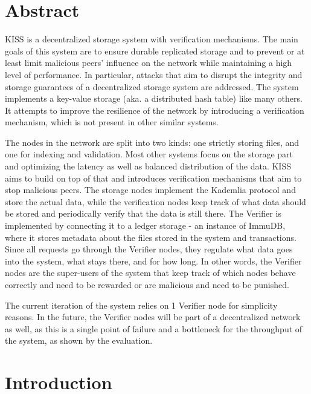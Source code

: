 \documentclass[ twoside,openright,titlepage,numbers=noenddot,headinclude,%
                footinclude=true,cleardoublepage=empty,abstractoff, %
                BCOR=5mm,paper=a4,fontsize=11pt,%
                ngerman,american,%
                ]{scrreprt}
\begin{document}
\raggedbottom
{} %
\pagestyle{plain}

\begingroup

\chapter*{Abstract}
KISS is a decentralized storage system with verification mechanisms.
The main goals of this system are to ensure durable replicated storage and to prevent
or at least limit malicious peers' influence on the network while maintaining a high level of performance.
In particular, attacks that aim to disrupt the integrity and
storage guarantees of a decentralized storage system are addressed.
The system implements a key-value storage (aka. a distributed hash table) like many others.
It attempts to improve the resilience of the network by introducing a verification mechanism,
which is not present in other similar systems.

The nodes in the network are split into two kinds: one strictly storing files,
and one for indexing and validation.
Most other systems focus on the storage part and optimizing the latency as well as balanced distribution
of the data.
KISS aims to build on top of that and introduces verification mechanisms that aim to stop malicious peers.
The storage nodes implement the Kademlia protocol and store the actual data,
while the verification nodes keep track of what data should be stored and periodically
verify that the data is still there.
The Verifier is implemented by connecting it to a ledger storage - an instance of ImmuDB,
where it stores metadata about the files stored in the system and transactions.
Since all requests go through the Verifier nodes, they regulate what data goes into the system, 
what stays there, and for how long.
In other words, the Verifier nodes are the super-users of the system that keep track of which
nodes behave correctly and need to be rewarded or are malicious and need to be punished.

The current iteration of the system relies on 1 Verifier node for simplicity reasons.
In the future, the Verifier nodes will be part of a decentralized network as well, 
as this is a single point of failure and a bottleneck for the throughput of the system,
as shown by the evaluation.



\vfill
\endgroup			

\chapter{Introduction}
\end{document}
